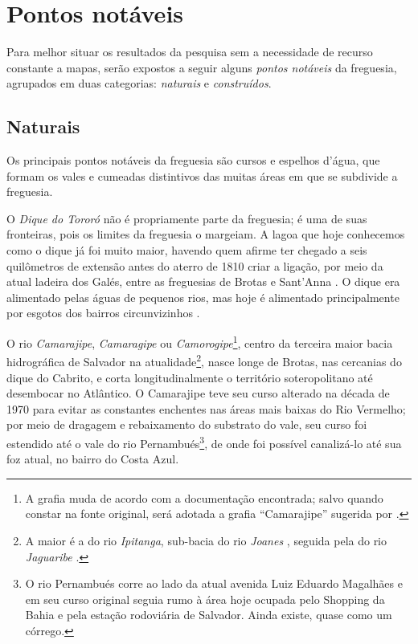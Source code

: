 \section{Pontos notáveis}\label{sec:pontnot}

Para melhor situar os resultados da pesquisa sem a necessidade de recurso constante a mapas, serão expostos a seguir alguns \textit{pontos notáveis} da freguesia, agrupados em duas categorias: \textit{naturais} e \textit{construídos}.

\subsection{Naturais}\label{subsec:pontnat}

Os principais pontos notáveis da freguesia são cursos e espelhos d'água, que formam os vales e cumeadas distintivos das muitas áreas em que se subdivide a freguesia.

O \textit{Dique do Tororó} não é propriamente parte da freguesia; é uma de suas fronteiras, pois os limites da freguesia o margeiam. A lagoa que hoje conhecemos como o dique já foi muito maior, havendo quem afirme ter chegado a seis quilômetros de extensão antes do aterro de 1810 criar a ligação, por meio da atual ladeira dos Galés, entre as freguesias de Brotas e Sant'Anna \cite[p.~48]{santos_aguas_2010}. O dique era alimentado pelas águas de pequenos rios, mas hoje é alimentado principalmente por esgotos dos bairros circunvizinhos \cite[p.~41]{santos_aguas_2010}.

O rio \textit{Camarajipe}, \textit{Camaragipe} ou \textit{Camorogipe}\footnote{A grafia muda de acordo com a documentação encontrada; salvo quando constar na fonte original, será adotada a grafia ``Camarajipe'' sugerida por .}, centro da terceira maior bacia hidrográfica de Salvador na atualidade\footnote{A maior é a do rio \textit{Ipitanga}, sub-bacia do rio \textit{Joanes} \cite[p.~311]{santos_aguas_2010}, seguida pela do rio \textit{Jaguaribe} \cite[p.~229]{santos_aguas_2010}.}, nasce longe de Brotas, nas cercanias do dique do Cabrito, e corta longitudinalmente o território soteropolitano até desembocar no Atlântico. O Camarajipe teve seu curso alterado na década de 1970 para evitar as constantes enchentes nas áreas mais baixas do Rio Vermelho; por meio de dragagem e rebaixamento do substrato do vale, seu curso foi estendido até o vale do rio Pernambués\footnote{O rio Pernambués corre ao lado da atual avenida Luiz Eduardo Magalhães e em seu curso original seguia rumo à área hoje ocupada pelo Shopping da Bahia e pela estação rodoviária de Salvador. Ainda existe, quase como um córrego.}, de onde foi possível canalizá-lo até sua foz atual, no bairro do Costa Azul.

